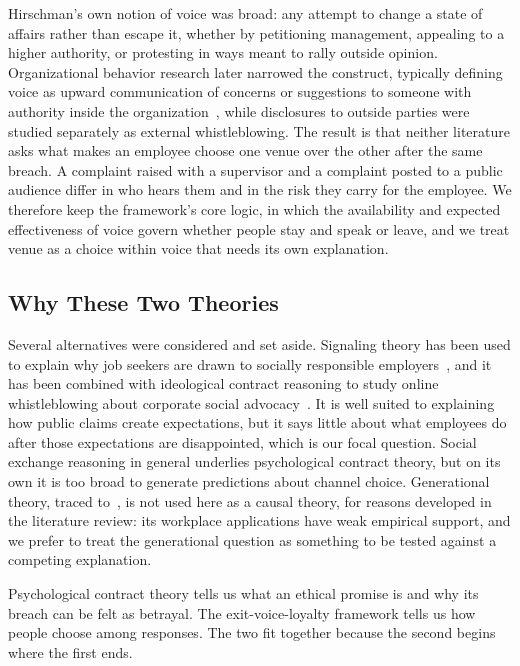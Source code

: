 Hirschman's own notion of voice was broad: any attempt to change a state of affairs rather than escape it, whether by petitioning management, appealing to a higher authority, or protesting in ways meant to rally outside opinion. Organizational behavior research later narrowed the construct, typically defining voice as upward communication of concerns or suggestions to someone with authority inside the organization~\citep{morrison2014employee}, while disclosures to outside parties were studied separately as external whistleblowing. The result is that neither literature asks what makes an employee choose one venue over the other after the same breach. A complaint raised with a supervisor and a complaint posted to a public audience differ in who hears them and in the risk they carry for the employee. We therefore keep the framework's core logic, in which the availability and expected effectiveness of voice govern whether people stay and speak or leave, and we treat venue as a choice within voice that needs its own explanation.

\subsection{Why These Two Theories}

Several alternatives were considered and set aside. Signaling theory has been used to explain why job seekers are drawn to socially responsible employers~\citep{jones2014why}, and it has been combined with ideological contract reasoning to study online whistleblowing about corporate social advocacy~\citep{yang2026managing}. It is well suited to explaining how public claims create expectations, but it says little about what employees do after those expectations are disappointed, which is our focal question. Social exchange reasoning in general underlies psychological contract theory, but on its own it is too broad to generate predictions about channel choice. Generational theory, traced to~\citet{mannheim1952problem}, is not used here as a causal theory, for reasons developed in the literature review: its workplace applications have weak empirical support, and we prefer to treat the generational question as something to be tested against a competing explanation.

Psychological contract theory tells us what an ethical promise is and why its breach can be felt as betrayal. The exit-voice-loyalty framework tells us how people choose among responses. The two fit together because the second begins where the first ends.

